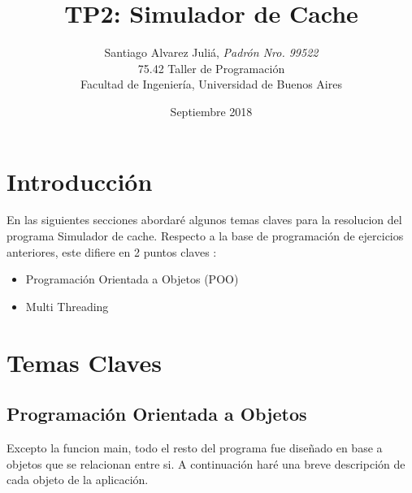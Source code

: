 \documentclass[a4paper,12pt]{report}
\title{	TP2: Simulador de Cache}
\author{	Santiago Alvarez Juli\'a, \textit{Padr\'on Nro. 99522}                     \\
            \normalsize{75.42 Taller de Programaci\'on}                             \\
            \normalsize{Facultad de Ingenier\'ia, Universidad de Buenos Aires}            \\
       }
\date{Septiembre 2018}
\begin{document}
\maketitle

\thispagestyle{empty}

\tableofcontents
\newpage
{}

\section{Introducci\'on}

En las siguientes secciones abordar\'e algunos temas claves para la resolucion del programa Simulador de cache. Respecto a la base de programaci\'on de ejercicios anteriores, este difiere en 2 puntos claves :

\begin{itemize}
\item Programaci\'on Orientada a Objetos (POO)
\item Multi Threading
\end{itemize}


\section{Temas Claves}

\subsection{Programaci\'on Orientada a Objetos}

Excepto la funcion main, todo el resto del programa fue dise\~nado en base a objetos que se relacionan entre si. A continuaci\'on har\'e una breve descripci\'on de cada objeto de la aplicaci\'on.
\end{document}
